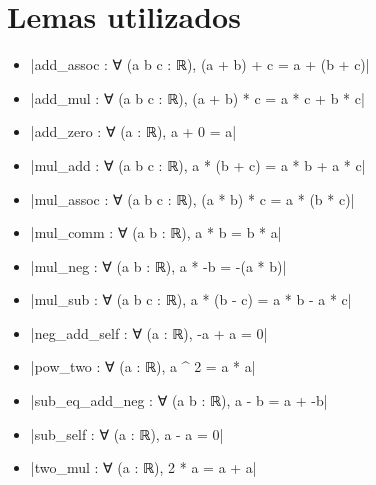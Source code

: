 \chapter*{Lemas utilizados}

\begin{itemize}
\item {}|add_assoc : ∀ (a b c : ℝ), (a + b) + c = a + (b + c)|
\item {}|add_mul : ∀ (a b c : ℝ), (a + b) * c = a * c + b * c|
\item {}|add_zero : ∀ (a : ℝ), a + 0 = a|
\item {}|mul_add : ∀ (a b c : ℝ), a * (b + c) = a * b + a * c|
\item {}|mul_assoc : ∀ (a b c : ℝ), (a * b) * c = a * (b * c)|
\item {}|mul_comm : ∀ (a b : ℝ), a * b = b * a|
\item {}|mul_neg : ∀ (a b : ℝ), a * -b = -(a * b)|
\item {}|mul_sub : ∀ (a b c : ℝ), a * (b - c) = a * b - a * c|
\item {}|neg_add_self : ∀ (a : ℝ), -a + a = 0|
\item {}|pow_two : ∀ (a : ℝ), a ^ 2 = a * a|
\item {}|sub_eq_add_neg : ∀ (a b : ℝ), a - b = a + -b|
\item {}|sub_self : ∀ (a : ℝ), a - a = 0|
\item {}|two_mul : ∀ (a : ℝ), 2 * a = a + a|
\end{itemize}


